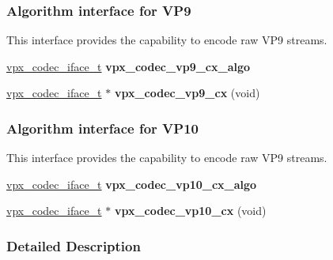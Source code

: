 \subsubsection*{Algorithm interface for V\+P9}
\label{_amgrp9a787aae8f239d3b1cb9aeff16fb31ef}%
This interface provides the capability to encode raw V\+P9 streams. \begin{DoxyCompactItemize}
\item 
\hyperlink{group__codec_gae99c3b04f4a567a311211cce3ae6b83b}{vpx\+\_\+codec\+\_\+iface\+\_\+t} {\bfseries vpx\+\_\+codec\+\_\+vp9\+\_\+cx\+\_\+algo}\hypertarget{group__vp8__encoder_ga2d01224b7a5b2a1ecf538493b3089d0f}{}\label{group__vp8__encoder_ga2d01224b7a5b2a1ecf538493b3089d0f}

\item 
\hyperlink{group__codec_gae99c3b04f4a567a311211cce3ae6b83b}{vpx\+\_\+codec\+\_\+iface\+\_\+t} $\ast$ {\bfseries vpx\+\_\+codec\+\_\+vp9\+\_\+cx} (void)\hypertarget{group__vp8__encoder_ga3fdeb42af524ef0f07695aab8d95ae2c}{}\label{group__vp8__encoder_ga3fdeb42af524ef0f07695aab8d95ae2c}

\end{DoxyCompactItemize}
\subsubsection*{Algorithm interface for V\+P10}
\label{_amgrpd19ab123522066fb3d11d80719b68480}%
This interface provides the capability to encode raw V\+P9 streams. \begin{DoxyCompactItemize}
\item 
\hyperlink{group__codec_gae99c3b04f4a567a311211cce3ae6b83b}{vpx\+\_\+codec\+\_\+iface\+\_\+t} {\bfseries vpx\+\_\+codec\+\_\+vp10\+\_\+cx\+\_\+algo}\hypertarget{group__vp8__encoder_gaa6a0d9723d25a0076ad7e1a4fbc09b07}{}\label{group__vp8__encoder_gaa6a0d9723d25a0076ad7e1a4fbc09b07}

\item 
\hyperlink{group__codec_gae99c3b04f4a567a311211cce3ae6b83b}{vpx\+\_\+codec\+\_\+iface\+\_\+t} $\ast$ {\bfseries vpx\+\_\+codec\+\_\+vp10\+\_\+cx} (void)\hypertarget{group__vp8__encoder_ga7095c9c0a7dbe043e07e0fa6453bff06}{}\label{group__vp8__encoder_ga7095c9c0a7dbe043e07e0fa6453bff06}

\end{DoxyCompactItemize}


\subsubsection{Detailed Description}


